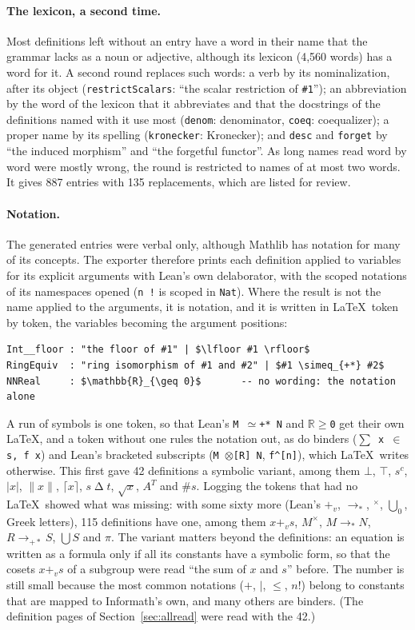 \documentclass{easychair}
\newcommand{\ttt}[1]{\texttt{#1}}
\begin{document}
\paragraph{The lexicon, a second time.} Most definitions left without an entry have a word in
their name that the grammar lacks as a noun or adjective, although its lexicon (4,560 words) has
a word for it. A second round replaces such words: a verb by its nominalization, after its object
(\ttt{restrictScalars}: ``the scalar restriction of \ttt{\#1}''); an abbreviation by the word of
the lexicon that it abbreviates and that the docstrings of the definitions named with it use
most (\ttt{denom}: denominator, \ttt{coeq}: coequalizer); a proper name by its spelling
(\ttt{kronecker}: Kronecker); and \ttt{desc} and \ttt{forget} by ``the induced morphism'' and
``the forgetful functor''. As long names read word by word were mostly wrong, the round is
restricted to names of at most two words. It gives 887 entries with 135 replacements, which are
listed for review.

\paragraph{Notation.} The generated entries were verbal only, although Mathlib has notation for
many of its concepts. The exporter therefore prints each definition applied to variables for its
explicit arguments with Lean's own delaborator, with the scoped notations of its namespaces
opened (\ttt{n !} is scoped in \ttt{Nat}). Where the result is not the name applied to the
arguments, it is notation, and it is written in \LaTeX\ token by token, the variables becoming
the argument positions:
\begin{lstlisting}
Int__floor : "the floor of #1" | $\lfloor #1 \rfloor$
RingEquiv  : "ring isomorphism of #1 and #2" | $#1 \simeq_{+*} #2$
NNReal     : $\mathbb{R}_{\geq 0}$       -- no wording: the notation alone
\end{lstlisting}
A run of symbols is one token, so that Lean's \ttt{M $\simeq$+* N} and \ttt{$\mathbb{R}$$\geq$0}
get their own \LaTeX, and a token without one rules the notation out, as do binders
(\ttt{$\sum$ x $\in$ s, f x}) and Lean's bracketed subscripts (\ttt{M $\otimes$[R] N},
\ttt{f\^{}[n]}), which \LaTeX\ writes otherwise. This
first gave 42 definitions a symbolic variant, among them $\bot$, $\top$, $s^c$, $|x|$, $\|x\|$,
$\lceil x \rceil$, $s \mathbin{\Delta} t$, $\sqrt{x}$, $A^T$ and $\# s$. Logging the tokens that
had no \LaTeX\ showed what was missing: with some sixty more (Lean's $+_v$, $\to_{*}$,
${}^{\times}$, $\bigcup_0$, Greek letters), 115 definitions have one, among them $x +_v s$, $M^{\times}$,
$M \to_{*} N$, $R \to_{+*} S$, $\bigcup S$ and $\pi$. The variant matters beyond the
definitions: an equation is written as a formula only if all its constants have a symbolic form,
so that the cosets $x +_v s$ of a subgroup were read ``the sum of $x$ and $s$'' before. The
number is still small because the most common notations ($+$, $\mid$, $\leq$, $n!$) belong to
constants that are mapped to Informath's own, and many others are binders. (The definition
pages of Section~\ref{sec:allread} were read with the 42.)
\end{document}
